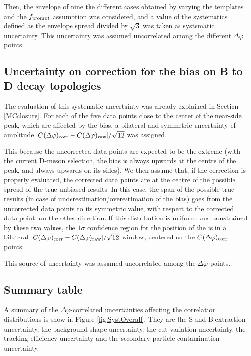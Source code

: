 Then, the envelope of nine the different cases obtained by varying the templates and the $f_{\rm prompt}$ assumption was considered, and a value of the systematics defined as the envelope spread divided by $\sqrt{3}$ was taken as systematic uncertainty. This uncertainty was assumed uncorrelated among the different $\Delta\varphi$ points.

\subsection{Uncertainty on correction for the bias on B to D decay topologies}
The evaluation of this systematic uncertainty was already explained in Section \ref{MCclosure}. For each of the five data points close to the center of the near-side peak, which are affected by the bias, a bilateral and symmetric uncertainty of amplitude $|C(\Delta\varphi)_{\rm corr} - C(\Delta\varphi)_{\rm raw}|/\sqrt{12}$ was assigned.

This because the uncorrected data points are expected to be the extreme (with the current D-meson selection, the bias is always upwards at the centre of the peak, and always upwards on its sides). We then assume that, if the correction is properly evaluated, the corrected data points are at the centre of the possible spread of the true unbiased results. In this case, the span of the possible true results (in case of underestimation/overestimation of the bias) goes from the uncorrected data points to its symmetric value, with respect to the corrected data point, on the other direction. If this distribution is uniform, and constrained by these two values, the $1\sigma$ confidence region for the position of the is in a bilateral $|C(\Delta\varphi)_{\rm corr} - C(\Delta\varphi)_{\rm raw}|/\sqrt{12}$ window, centered on the $C(\Delta\varphi)_{\rm corr}$ points.

This source of uncertainty was assumed uncorrelated among the $\Delta\varphi$ points.

\subsection{Summary table}
A summary of the $\Delta\varphi$-correlated uncertainties affecting the correlation distributions is show in Figure \ref{fig:SystOverall}. They are the S and B extraction uncertainty, the background shape uncertainty, the cut variation uncertainty, the tracking efficiency uncertainty and the secondary particle contamination uncertainty.

